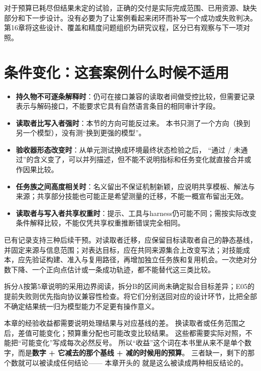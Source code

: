 对于预算已耗尽但结果未定的试验，正确的交付是实际完成范围、已用资源、缺失部分和下一步设计。没有必要为了让案例看起来闭环而补写一个成功或失败判决。第16章将这些设计、覆盖和精度问题组织为研究议程，区分已有观察与下一项对照。


\section{条件变化：这套案例什么时候不适用}
\label{sec:ch15-conditions}

\begin{itemize}
  \item \textbf{持久物不可逐条解释时}：仍可在接口兼容的读取者间做受控比较，但需要记录表示与解码接口，不能要求它具有自然语言条目的相同审计字段。
  \item \textbf{读取者比写入者强时}：本节的方向可能反过来。
        本书只测了一个方向（换到另一个模型），没有测“换到更强的模型”。
  \item \textbf{验收器形态改变时}：从单元测试换成环境最终状态检验之后，
        “通过 / 未通过”的含义变了，可以并列描述，但不能不说明指标和任务变化就直接合并或作因果比较。
  \item \textbf{任务族之间高度相关时}：名义留出不保证机制新颖，应说明共享模板、解法与来源；共享部分技能也可能正是希望测量的迁移，不能一概宣布留出无效。
  \item \textbf{读取者与写入者共享权重时}：提示、工具与harness仍可能不同；需按实际改变条件解释比较，不能仅凭共享权重推断错误完全相同。
\end{itemize}

\label{sec:ch15-claims}

已有记录支持三种后续干预。对读取者迁移，应保留目标读取者自己的静态基线，并固定来源与信息范围；对表达目标，应在共同来源集合上改变写法；对技能成本，应先验证构建、准入与复用路径，再增加独立任务族和复用机会。一次绝对分数下降、一个正向点估计或一条成功轨迹，都不能替代这三类比较。

拆分A按第5章说明的采用边界阅读，拆分B的区间尚未确定拟合目标差异；E05的提前失败则优先指向协议兼容性检查。将它们分别送回对应的设计环节，比把全部不确定结果统一归为模型能力不足更有操作意义。

\begin{principlebox}
本章的经验收益都需要说明处理结果与对应基线的差。
换读取者或任务范围之后，差值可能变化；预算重分配也可能改变比较结果。
这些都需要实际对照，不能把“可能变化”写成每次必然反号。
所以“收益”这个词在本书里从来不是单个数字，而是\textbf{数字 + 它减去的那个基线 + 减的时候用的预算}。
三者缺一，剩下的那个数就可以被读成任何结论——
本章开头的  就是这么被读成两种相反结论的。
\end{principlebox}

